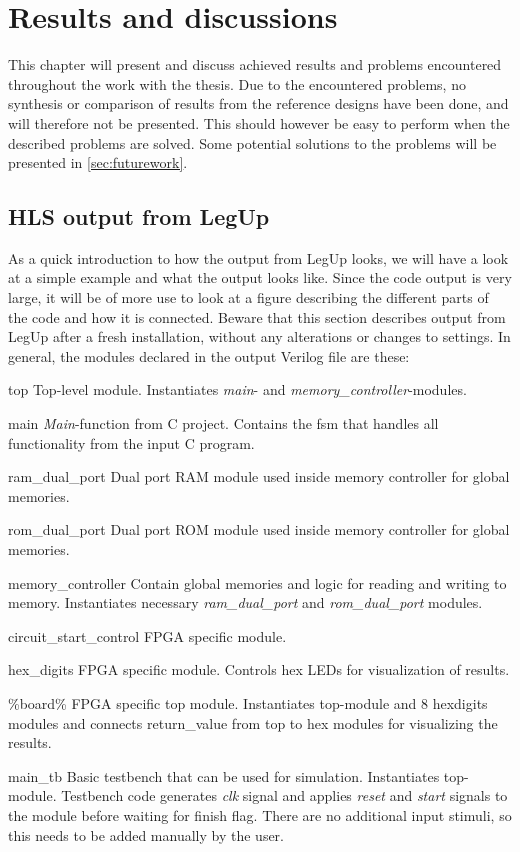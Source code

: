 \chapter{Results and discussions}
\label{chp:resdisc}
This chapter will present and discuss achieved results and problems encountered throughout the work with the thesis. Due to the encountered problems, no synthesis or comparison of results from the reference designs have been done, and will therefore not be presented. This should however be easy to perform when the described problems are solved. Some potential solutions to the problems will be presented in \cref{sec:futurework}.
\section{HLS output from LegUp}
\label{sec:legupoutput}
As a quick introduction to how the output from LegUp looks, we will have a look at a simple example and what the output looks like. Since the code output is very large, it will be of more use to look at a figure describing the different parts of the code and how it is connected. Beware that this section describes output from LegUp after a fresh installation, without any alterations or changes to settings. In general, the modules declared in the output Verilog file are these:
\begin{compactdesc}
    \item[top]Top-level module. Instantiates \textit{main}- and \textit{memory\_controller}-modules.
    \item[main]\textit{Main}-function from C project. Contains the \gls{fsm} that handles all functionality from the input C program.
    \item[ram\_dual\_port] Dual port RAM module used inside memory controller for global memories.
    \item[rom\_dual\_port] Dual port ROM module used inside memory controller for global memories.
    \item[memory\_controller]Contain global memories and logic for reading and writing to memory. Instantiates necessary \textit{ram\_dual\_port} and \textit{rom\_dual\_port} modules.
    \item[circuit\_start\_control]FPGA specific module. 
    \item[hex\_digits]FPGA specific module. Controls hex LEDs for visualization of results.
    \item[\%board\%]FPGA specific top module. Instantiates top-module and 8 hex{\textunderscore}digits modules and connects return\_value from top to hex modules for visualizing the results.
    \item[main\_tb]Basic testbench that can be used for simulation. Instantiates top-module. Testbench code generates \textit{clk} signal and applies \textit{reset} and \textit{start} signals to the module before waiting for finish flag. There are no additional input stimuli, so this needs to be added manually by the user.
\end{compactdesc}

